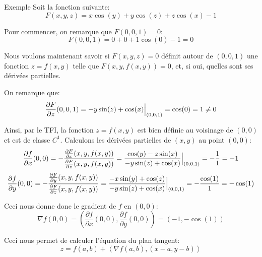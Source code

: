\documentclass[a4paper]{article}
\begin{document}
\begin{parag}{Exemple}
    Soit la fonction suivante:
    \[F\left(x, y, z\right) = x\cos\left(y\right) + y\cos\left(z\right) + z\cos\left(x\right) - 1\]

    Pour commencer, on remarque que $F\left(0, 0, 1\right) = 0$:
    \[F\left(0, 0, 1\right) = 0 + 0 + 1 \cos\left(0\right) - 1 = 0\]

    Nous voulons maintenant savoir si $F\left(x, y, z\right) = 0$ définit autour de $\left(0, 0, 1\right)$ une fonction $z = f\left(x, y\right)$ telle que $F\left(x, y, f\left(x, y\right)\right) = 0$, et, si oui, quelles sont ses dérivées partielles.

    On remarque que:
    \[\frac{\partial F}{\partial z}\left(0, 0, 1\right) = -y \sin\left(z\right) + \cos\left(x\right) \eval_{\left(0, 0, 1\right)}^{} = \cos\left(0\right) = 1 \neq 0\]

    Ainsi, par le TFI, la fonction $z = f\left(x, y\right)$ est bien définie au voisinage de $\left(0, 0\right)$ et est de classe $C^1$. Calculons les dérivées partielles de $\left(x, y\right)$ au point $\left(0, 0\right)$:
    \[\frac{\partial f}{\partial x}\left(0, 0\right) = - \frac{\frac{\partial F}{\partial x}\left(x, y, f\left(x, y\right)\right)}{\frac{\partial F}{\partial z}\left(x, y, f\left(x, y\right)\right)} = \frac{\cos\left(y\right) - z\sin\left(x\right)}{-y\sin\left(z\right) + \cos\left(x\right)}\eval_{\left(0, 0, 1\right)}^{} = -\frac{1}{1} = -1\]
        \[\frac{\partial f}{\partial y}\left(0, 0\right) = - \frac{\frac{\partial F}{\partial y}\left(x, y, f\left(x, y\right)\right)}{\frac{\partial F}{\partial z}\left(x, y, f\left(x, y\right)\right)} = \frac{-x \sin\left(y\right) + \cos\left(z\right)}{-y\sin\left(z\right) + \cos\left(x\right)}\eval_{\left(0, 0, 1\right)}^{} = -\frac{\cos\left(1\right)}{1} = -\cos\left(1\right)\]

    Ceci nous donne donc le gradient de $f$ en $\left(0, 0\right)$:
    \[\nabla f\left(0, 0\right)= \left(\frac{\partial f}{\partial x}\left(0, 0\right), \frac{\partial f}{\partial y}\left(0, 0\right)\right) = \left(-1, -\cos\left(1\right)\right)\]

    Ceci nous permet de calculer l'équation du plan tangent:
    \[z = f\left(a, b\right) + \left<\nabla f\left(a, b\right), \left(x-a, y- b\right)\right>\]

\end{parag}
\end{document}
